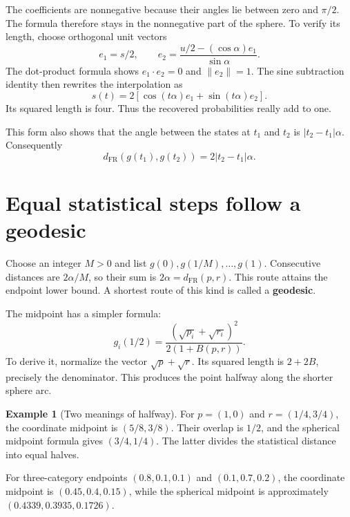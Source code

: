 \documentclass[11pt,oneside,openany]{book}
\theoremstyle{definition}
\newtheorem{example}{Example}[chapter]
\theoremstyle{remark}
\numberwithin{equation}{chapter}
\begin{document}
The coefficients are nonnegative because their angles lie between zero and \(\pi/2\). The formula therefore stays in the nonnegative part of the sphere. To verify its length, choose orthogonal unit vectors \[e_1=s/2,\qquad
e_2=\frac{u/2-(\cos\alpha)e_1}{\sin\alpha}.\] The dot-product formula shows \(e_1\cdot e_2=0\) and \(\|e_2\|=1\). The sine subtraction identity then rewrites the interpolation as \[s(t)=2[\cos(t\alpha)e_1+\sin(t\alpha)e_2].\] Its squared length is four. Thus the recovered probabilities really add to one.

This form also shows that the angle between the states at \(t_1\) and \(t_2\) is \(|t_2-t_1|\alpha\). Consequently \[d_{\mathrm{FR}}(g(t_1),g(t_2))=2|t_2-t_1|\alpha.\]

\section{Equal statistical steps follow a geodesic}\label{ch08-equal-statistical-steps-follow-a-geodesic}

Choose an integer \(M>0\) and list \(g(0),g(1/M),\ldots,g(1)\). Consecutive distances are \(2\alpha/M\), so their sum is \(2\alpha=d_{\mathrm{FR}}(p,r)\). This route attains the endpoint lower bound. A shortest route of this kind is called a \textbf{geodesic}.

The midpoint has a simpler formula: \[\boxed{g_i(1/2)=
\frac{(\sqrt{p_i}+\sqrt{r_i})^2}{2(1+B(p,r))}.}\] To derive it, normalize the vector \(\sqrt p+\sqrt r\). Its squared length is \(2+2B\), precisely the denominator. This produces the point halfway along the shorter sphere arc.

\begin{example}[Two meanings of halfway]

For \(p=(1,0)\) and \(r=(1/4,3/4)\), the coordinate midpoint is \((5/8,3/8)\). Their overlap is \(1/2\), and the spherical midpoint formula gives \((3/4,1/4)\). The latter divides the statistical distance into equal halves.

For three-category endpoints \((0.8,0.1,0.1)\) and \((0.1,0.7,0.2)\), the coordinate midpoint is \((0.45,0.4,0.15)\), while the spherical midpoint is approximately \((0.4339,0.3935,0.1726)\).

\end{example}
\end{document}
